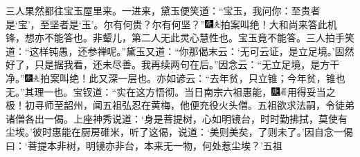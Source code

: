 三人果然都往宝玉屋里来。一进来，黛玉便笑道：“宝玉，我问你：至贵者是‘宝’，至坚者是‘玉’。尔有何贵？尔有何坚？”{\includegraphics[width=3mm]{../Images/00004}\includegraphics[width=3mm]{../Images/00012}\footnotesize \kaishu 拍案叫绝！大和尚来答此机锋，想亦不能答也。非颦儿，第二人无此灵心慧性也。}宝玉竟不能答。三人拍手笑道：“这样钝愚，还参禅呢。”黛玉又道：“你那偈末云：‘无可云证，是立足境。’固然好了，只是据我看，还未尽善。我再续两句在后。”因念云：“无立足境，是方干净。”{\includegraphics[width=3mm]{../Images/00004}\includegraphics[width=3mm]{../Images/00012}\footnotesize \kaishu 拍案叫绝！此又深一层也。亦如谚云：“去年贫，只立锥；今年贫，锥也无。”其理一也。}宝钗道：“实在这方悟彻。当日南宗六祖惠能，{\includegraphics[width=3mm]{../Images/00004}\includegraphics[width=3mm]{../Images/00010}\footnotesize \kaishu 用得妥当之极！}初寻师至韶州，闻五祖弘忍在黄梅，他便充役火头僧。五祖欲求法嗣，令徒弟诸僧各出一偈。上座神秀说道：‘身是菩提树，心如明镜台，时时勤拂拭，莫使有尘埃。’彼时惠能在厨房碓米，听了这偈，说道：‘美则美矣，了则未了。’因自念一偈曰：‘菩提本非树，明镜亦非台，本来无一物，何处惹尘埃？’五祖